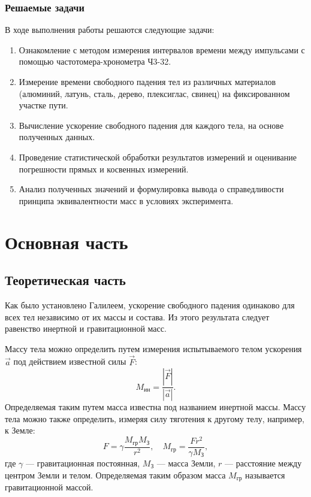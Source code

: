 \documentclass[a4paper,14pt]{extarticle}
\theoremstyle{plain}
\theoremstyle{remark}
\theoremstyle{definition}
\begin{document}
\subsubsection{Решаемые задачи}
В ходе выполнения работы решаются следующие задачи:
\begin{enumerate}
    \item Ознакомление с методом измерения интервалов времени между импульсами с помощью частотомера-хронометра Ч3-32.
    \item Измерение времени свободного падения тел из различных материалов (алюминий, латунь, сталь, дерево, плексиглас, свинец) на фиксированном участке пути.
    \item Вычисление ускорение свободного падения для каждого тела, на основе полученных данных.
    \item Проведение статистической обработки результатов измерений и оценивание погрешности прямых и косвенных измерений.
    \item Анализ полученных значений и формулировка вывода о справедливости принципа эквивалентности масс в условиях эксперимента.
\end{enumerate}

\newpage

\section{Основная часть}

\subsection{Теоретическая часть}

Как было установлено Галилеем, ускорение свободного падения одинаково для всех тел независимо от их массы и состава. Из этого результата следует равенство инертной и гравитационной масс.

Массу тела можно определить путем измерения испытываемого телом ускорения $\vec{a}$ под действием известной силы $\vec{F}$:
\begin{equation}
M_{\text{ин}} = \frac{|\vec{F}|}{|\vec{a}|}.
\end{equation}
Определяемая таким путем масса известна под названием инертной массы. Массу тела можно также определить, измеряя силу тяготения к другому телу, например, к Земле:
\begin{equation}
F = \gamma \frac{M_{\text{гр}} M_{\text{З}}}{r^2}, \quad M_{\text{гр}} = \frac{F r^2}{\gamma M_{\text{З}}},
\end{equation}
где $\gamma$ — гравитационная постоянная, $M_{\text{З}}$ — масса Земли, $r$ — расстояние между центром Земли и телом. 
Определяемая таким образом масса $M_{\text{гр}}$ называется гравитационной массой.
\end{document}

